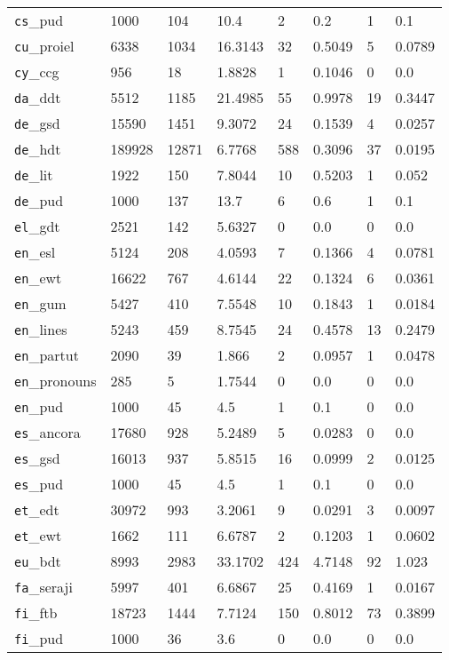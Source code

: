 \begin{longtable}{|l|l|l|l|l|l|l|l|}
\texttt{cs}\_pud & 1000 & 104 & 10.4 & 2 & 0.2 & 1 & 0.1\\
\texttt{cu}\_proiel & 6338 & 1034 & 16.3143 & 32 & 0.5049 & 5 & 0.0789\\
\texttt{cy}\_ccg & 956 & 18 & 1.8828 & 1 & 0.1046 & 0 & 0.0\\
\texttt{da}\_ddt & 5512 & 1185 & 21.4985 & 55 & 0.9978 & 19 & 0.3447\\
\texttt{de}\_gsd & 15590 & 1451 & 9.3072 & 24 & 0.1539 & 4 & 0.0257\\
\texttt{de}\_hdt & 189928 & 12871 & 6.7768 & 588 & 0.3096 & 37 & 0.0195\\
\texttt{de}\_lit & 1922 & 150 & 7.8044 & 10 & 0.5203 & 1 & 0.052\\
\texttt{de}\_pud & 1000 & 137 & 13.7 & 6 & 0.6 & 1 & 0.1\\
\texttt{el}\_gdt & 2521 & 142 & 5.6327 & 0 & 0.0 & 0 & 0.0\\
\texttt{en}\_esl & 5124 & 208 & 4.0593 & 7 & 0.1366 & 4 & 0.0781\\
\texttt{en}\_ewt & 16622 & 767 & 4.6144 & 22 & 0.1324 & 6 & 0.0361\\
\texttt{en}\_gum & 5427 & 410 & 7.5548 & 10 & 0.1843 & 1 & 0.0184\\
\texttt{en}\_lines & 5243 & 459 & 8.7545 & 24 & 0.4578 & 13 & 0.2479\\
\texttt{en}\_partut & 2090 & 39 & 1.866 & 2 & 0.0957 & 1 & 0.0478\\
\texttt{en}\_pronouns & 285 & 5 & 1.7544 & 0 & 0.0 & 0 & 0.0\\
\texttt{en}\_pud & 1000 & 45 & 4.5 & 1 & 0.1 & 0 & 0.0\\
\texttt{es}\_ancora & 17680 & 928 & 5.2489 & 5 & 0.0283 & 0 & 0.0\\
\texttt{es}\_gsd & 16013 & 937 & 5.8515 & 16 & 0.0999 & 2 & 0.0125\\
\texttt{es}\_pud & 1000 & 45 & 4.5 & 1 & 0.1 & 0 & 0.0\\
\texttt{et}\_edt & 30972 & 993 & 3.2061 & 9 & 0.0291 & 3 & 0.0097\\
\texttt{et}\_ewt & 1662 & 111 & 6.6787 & 2 & 0.1203 & 1 & 0.0602\\
\texttt{eu}\_bdt & 8993 & 2983 & 33.1702 & 424 & 4.7148 & 92 & 1.023\\
\texttt{fa}\_seraji & 5997 & 401 & 6.6867 & 25 & 0.4169 & 1 & 0.0167\\
\texttt{fi}\_ftb & 18723 & 1444 & 7.7124 & 150 & 0.8012 & 73 & 0.3899\\
\texttt{fi}\_pud & 1000 & 36 & 3.6 & 0 & 0.0 & 0 & 0.0\\

\end{longtable}
